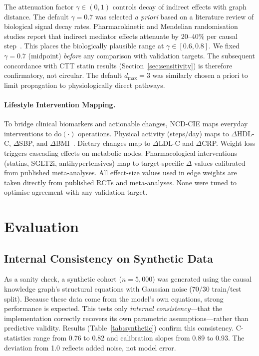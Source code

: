 \documentclass[runningheads]{llncs}
\begin{document}
The attenuation factor $\gamma \in (0,1)$ controls decay of indirect
effects with graph distance.
The default $\gamma = 0.7$ was selected \emph{a priori} based on a
literature review of biological signal decay rates.
Pharmacokinetic and Mendelian randomisation studies report that
indirect mediator effects attenuate by 20--40\% per causal
step~\cite{ctt2010,pearl2009causality}.
This places the biologically plausible range at
$\gamma \in [0.6, 0.8]$.
We fixed $\gamma = 0.7$ (midpoint) \emph{before} any comparison with
validation targets.
The subsequent concordance with CTT statin results
(Section~\ref{sec:sensitivity}) is therefore confirmatory, not
circular.
The default $d_{\max} = 3$ was similarly chosen a priori to limit
propagation to physiologically direct pathways.

\paragraph{Lifestyle Intervention Mapping.}
To bridge clinical biomarkers and actionable changes, NCD-CIE maps
everyday interventions to $\mathrm{do}(\cdot)$ operations.
Physical activity (steps/day) maps to $\Delta$HDL-C, $\Delta$SBP,
and $\Delta$BMI~\cite{naci2018comparative}.
Dietary changes map to $\Delta$LDL-C and $\Delta$CRP\@.
Weight loss triggers cascading effects on metabolic nodes.
Pharmacological interventions (statins, SGLT2i, antihypertensives)
map to target-specific $\Delta$ values calibrated from published
meta-analyses.
All effect-size values used in edge weights are taken directly from
published RCTs and meta-analyses.
None were tuned to optimise agreement with any validation target.

\section{Evaluation}\label{sec:validation}

\subsection{Internal Consistency on Synthetic Data}\label{sec:synthetic}

As a sanity check, a synthetic cohort ($n = 5{,}000$) was generated
using the causal knowledge graph's structural equations with Gaussian
noise (70/30 train/test split).
Because these data come from the model's own equations, strong
performance is expected.
This tests only \emph{internal consistency}---that the implementation
correctly recovers its own parametric assumptions---rather than
predictive validity.
Results (Table~\ref{tab:synthetic}) confirm this consistency.
C-statistics range from 0.76 to 0.82 and calibration slopes from
0.89 to 0.93.
The deviation from 1.0 reflects added noise, not model error.
\end{document}

